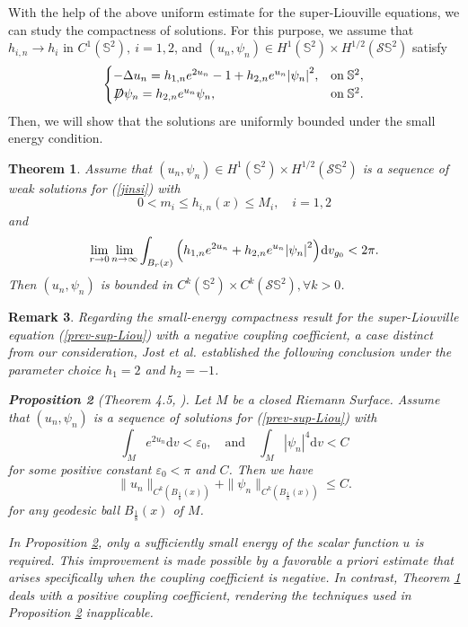 \documentclass[a4paper, 12pt]{article}
\newtheorem{theorem}{Theorem}[section]
\newtheorem{remark}[theorem]{Remark}
\newtheorem{proposition}[theorem]{Proposition}
\def\slashiii#1{\setbox0=\hbox{$#1$}#1\hskip-\wd0\hbox to\wd0{\hss\sl/\/\hss}}
\begin{document}
With the help of the above uniform estimate for the super-Liouville equations, we can study the compactness of solutions. For this purpose, we assume that ${h_{i,n}} \to h_i$ in $C^1({\mathbb{S}^2}),\ i=1,2$, and $(u_n,\psi_n)\in H^1(\mathbb{S}^2)\times H^{1/2}( \mathcal{S}\mathbb{S}^2 )$ satisfy
\begin{equation}\label{jinsi}
	\begin{cases}
		{ - \Delta u_n = {h_{1,n}}{e^{2u_n}} - 1 + {h_{2,n}}{e^{u_n }}{{\left| \psi_n   \right|}^2},}&{{\text{on}}\;{\mathbb{S}^2},} \\
		{\slashiii{D}\psi_n   ={h_{2,n}}{e^{u_n}}\psi_n  ,}&{{\text{on}}\;{\mathbb{S}^2}.}
	\end{cases}
\end{equation}
Then, we will show that the solutions are uniformly bounded under the small energy condition.
\begin{theorem}\label{thm1.3}
	Assume that \((u_n, \psi_n) \in H^1(\mathbb{S}^2)\times H^{1/2}( \mathcal{S}\mathbb{S}^2 )\) is a sequence of weak solutions for (\ref{jinsi}) with
	\begin{equation}\label{coefficient-bound}
		0 < m_i \leq {h_{i,n}}\left( x \right) \leq M_i,\quad i=1,2
	\end{equation}
	and
	\begin{equation}\label{concentrate}
		\mathop {\lim }\limits_{r \to 0} \mathop {\lim }\limits_{n \to \infty } \int_{{B_r}(x)} {\left( {{h_{1,n}}{e^{2{u_n}}} +{h_{2,n}} {e^{{u_n}}}{{\left| \psi_n  \right|}^2}} \right)} {\mkern 1mu} \mathrm{d}{v_{{g_0}}} < 2\pi .
	\end{equation}
	Then \(\left(  u_n,\psi_n \right) \) is bounded in  \( C^k(\mathbb{S}^2)\times {C^k}\left( \mathcal{S}\mathbb{S}^2 \right) ,\forall k>0\).
\end{theorem}
\begin{remark}
	Regarding the small-energy compactness result for the super-Liouville equation (\ref{prev-sup-Liou}) with a negative coupling coefficient, a case distinct from our consideration, Jost et al. \cite[Theorem 4.5]{jost2007super} established the following conclusion under the parameter choice $h_1=2$ and \( h_{2}=-1 \).
	\begin{proposition}[Theorem 4.5, \cite{jost2007super}]\label{JZW}
		Let $M$ be a closed Riemann Surface. Assume that \((u_n, \psi_n)\) is a sequence of solutions for (\ref{prev-sup-Liou})
		with		
		\[
		\int_M e^{2u_n} \mathrm{d}v < \varepsilon_0, \quad \text{and} \quad \int_M |\psi_n|^4 \mathrm{d}v < C
		\]		
		for some positive constant \(\varepsilon_0 < \pi\) and \(C\). Then we have		
		\[
		\|u_n\|_{C^k(B_{\frac{1}{8}}(x))} + \|\psi_n\|_{C^k(B_{\frac{1}{8}}(x))} \leq C.
		\]		
		for any geodesic ball \(B_{\frac{1}{8}}(x)\) of \(M\).
	\end{proposition}
	In Proposition \ref{JZW}, only a sufficiently small energy of the scalar function \( u \) is required. This improvement is made possible by a favorable a priori estimate that arises specifically when the coupling coefficient is negative. In contrast, Theorem \ref{thm1.3} deals with a positive coupling coefficient, rendering the techniques used in Proposition \ref{JZW} inapplicable.
\end{remark}
\end{document}

